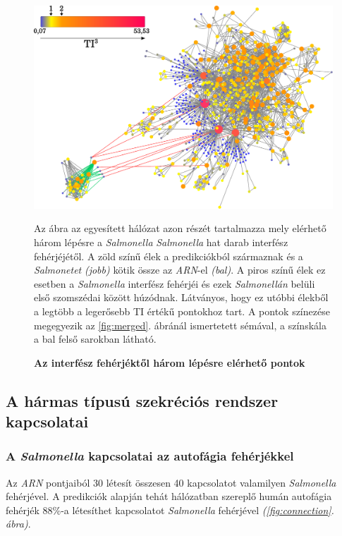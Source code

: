 \documentclass[a4paper,12pt]{article}
\newenvironment{imgdesc}{
		\small
		\singlespacing
		\begin{center}
		
	}{
		\end{center}	
	}
\begin{document}
			\begin{figure}[H]
				\includegraphics[scale=0.50]{img/merged-3-step-from-connecting-salmonella.pdf}
				\centering
				\caption{ \textbf{Az interfész fehérjéktől három lépésre elérhető pontok}}
				\begin{imgdesc}
					Az ábra az egyesített hálózat azon részét tartalmazza mely elérhető három lépésre a \textit{Salmonella} \textit{Salmonella} hat darab interfész fehérjéjétől. A zöld színű élek a predikciókból származnak és a \textit{Salmonetet} \textit{(jobb)} kötik össze az \textit{ARN}-el \textit{(bal)}. A piros színű élek ez esetben a \textit{Salmonella} interfész fehérjéi és ezek \textit{Salmonellán} belüli első szomszédai között húzódnak. Látványos, hogy ez utóbbi élekből a legtöbb a legerősebb TI értékű pontokhoz tart. A pontok színezése megegyezik az \ref{fig:merged}. ábránál ismertetett sémával, a színskála a bal felső sarokban látható.
				\end{imgdesc}			
				\label{fig:merged-3-step}			 		 
			\end{figure}			
		
	\subsection{A hármas típusú szekréciós rendszer kapcsolatai}	
		
		\subsubsection{A \textit{Salmonella} kapcsolatai az autofágia fehérjékkel}
		
		Az \textit{ARN} pontjaiból 30 létesít összesen 40 kapcsolatot valamilyen \textit{Salmonella} fehérjével. A predikciók alapján tehát hálózatban szereplő humán autofágia fehérjék 88\%-a létesíthet kapcsolatot \textit{Salmonella} fehérjével \textit{(\ref{fig:connection}. ábra)}.
		
\end{document}
